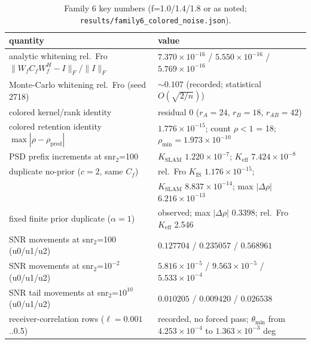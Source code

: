\documentclass[12pt]{article}
\begin{document}
\begin{table}[htbp]
\centering
\small
\caption{Family 6 key numbers (f=1.0/1.4/1.8 or as noted;
\texttt{results/family6\_colored\_noise.json}).}
\label{tab:f6}
\begin{tabular}{p{} p{}}
\toprule
quantity & value \\
\midrule
analytic whitening rel.\ Fro
$\|W_fC_fW_f^H-I\|_F/\|I\|_F$ &
$7.370\times10^{-16}$ / $5.550\times10^{-16}$ / $5.769\times10^{-16}$ \\
Monte-Carlo whitening rel.\ Fro (seed 2718) &
$\sim0.107$ (recorded; statistical $O(\sqrt{2/n})$) \\
colored kernel/rank identity & residual 0 ($r_A=24$, $r_B=18$, $r_{AB}=42$) \\
colored retention identity $\max|\rho-\rho_{\mathrm{pred}}|$ &
$1.776\times10^{-15}$; count $\rho<1$ = 18; $\rho_{\min}=1.973\times10^{-10}$ \\
PSD prefix increments at snr$_2$=100 &
$K_{\mathrm{SLAM}}$ $1.220\times10^{-7}$; $K_{\mathrm{eff}}$ $7.424\times10^{-8}$ \\
duplicate no-prior ($c{=}2$, same $C_f$) &
rel.\ Fro $K_{\mathrm{IS}}$ $1.176\times10^{-15}$; \\
 & $K_{\mathrm{SLAM}}$ $8.837\times10^{-14}$; max $|\Delta\rho|$ $6.216\times10^{-13}$ \\
fixed finite prior duplicate ($\alpha{=}1$) & observed;
max $|\Delta\rho|$ $0.3398$; rel.\ Fro $K_{\mathrm{eff}}$ 2.546 \\
SNR movements at snr$_2$=100 (u0/u1/u2) &
$0.127704$ / $0.235057$ / $0.568961$ \\
SNR movements at snr$_2$=$10^{-2}$ (u0/u1/u2) &
$5.816\times10^{-5}$ / $9.563\times10^{-5}$ / $5.533\times10^{-4}$ \\
SNR tail movements at snr$_2$=$10^{10}$ (u0/u1/u2) &
$0.010205$ / $0.009420$ / $0.026538$ \\
receiver-correlation rows ($\ell=0.001$..0.5) & recorded, no forced pass;
$\theta_{\min}$ from $4.253\times10^{-4}$ to $1.363\times10^{-3}$ deg \\
\bottomrule
\end{tabular}
\end{table}
\end{document}
